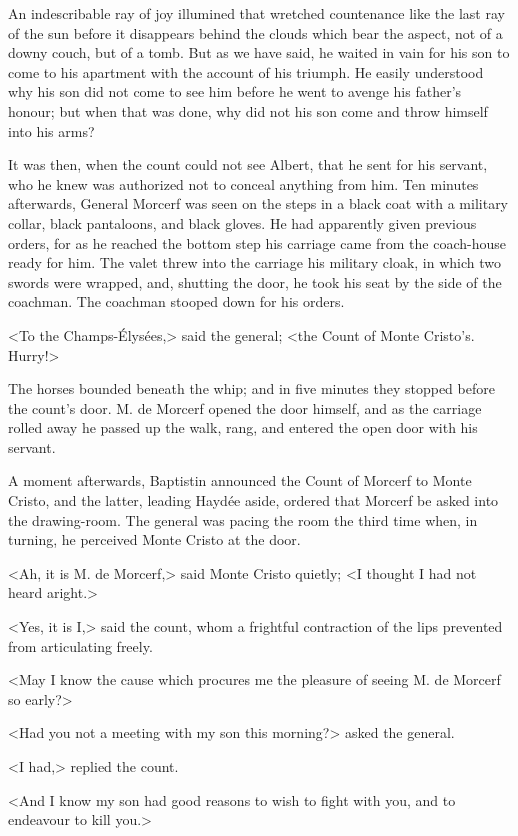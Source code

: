  An indescribable ray of joy illumined that wretched countenance like the last ray of the sun before it disappears behind the clouds which bear the aspect, not of a downy couch, but of a tomb. But as we have said, he waited in vain for his son to come to his apartment with the account of his triumph. He easily understood why his son did not come to see him before he went to avenge his father's honour; but when that was done, why did not his son come and throw himself into his arms? 

 It was then, when the count could not see Albert, that he sent for his servant, who he knew was authorized not to conceal anything from him. Ten minutes afterwards, General Morcerf was seen on the steps in a black coat with a military collar, black pantaloons, and black gloves. He had apparently given previous orders, for as he reached the bottom step his carriage came from the coach-house ready for him. The valet threw into the carriage his military cloak, in which two swords were wrapped, and, shutting the door, he took his seat by the side of the coachman. The coachman stooped down for his orders. 

 <To the Champs-Élysées,> said the general; <the Count of Monte Cristo's. Hurry!> 

 The horses bounded beneath the whip; and in five minutes they stopped before the count's door. M. de Morcerf opened the door himself, and as the carriage rolled away he passed up the walk, rang, and entered the open door with his servant. 

 A moment afterwards, Baptistin announced the Count of Morcerf to Monte Cristo, and the latter, leading Haydée aside, ordered that Morcerf be asked into the drawing-room. The general was pacing the room the third time when, in turning, he perceived Monte Cristo at the door. 

 <Ah, it is M. de Morcerf,> said Monte Cristo quietly; <I thought I had not heard aright.> 

 <Yes, it is I,> said the count, whom a frightful contraction of the lips prevented from articulating freely. 

 <May I know the cause which procures me the pleasure of seeing M. de Morcerf so early?> 

 <Had you not a meeting with my son this morning?> asked the general. 

 <I had,> replied the count. 

 <And I know my son had good reasons to wish to fight with you, and to endeavour to kill you.> 

